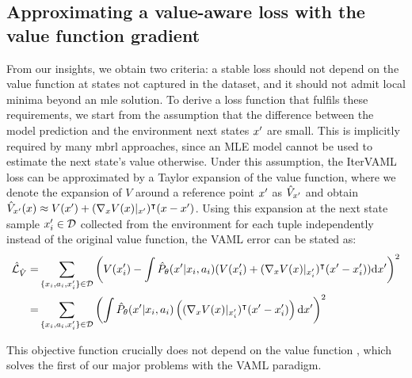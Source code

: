 \subsection{Approximating a value-aware loss with the value function gradient}
From our insights, we obtain two criteria: a stable loss should not depend on the value function at states not captured in the dataset, and it should not admit local minima beyond an \ac{mle} solution.
To derive a loss function that fulfils these requirements, we start from the assumption that the difference between the model prediction and the environment next states $x'$ are small.
This is implicitly required by many \ac{mbrl} approaches, since an MLE model cannot be used to estimate the next state's value otherwise. 
Under this assumption, the IterVAML loss can be approximated by a Taylor expansion of the value function, where we denote the expansion of $V$ around a reference point $x'$ as $\hat{V}_{x'}$ and obtain $\hat{V}_{x'}(x) \approx V(x') + (\nabla_x V(x)|_{x'})^\intercal (x - x')$.
Using this expansion at the next state sample $x'_i \in \mathcal{D}$ collected from the environment for each tuple independently instead of the original value function, the VAML error can be stated as:
\begin{align}
    \hat{\mathcal{L}}_{\hat{V}}=&\sum_{\{x_i,a_i,x'_i\}\in\mathcal{D}}{\left(V(x'_i) - \int \hat{P}_\theta(x'|x_i,a_i) (V(x'_i) + (\nabla_x V(x)|_{x'_i})^\intercal (x' - x'_i)) \mathrm{d}x'\right)^2}\\
    =&\sum_{\{x_i,a_i,x'_i\}\in\mathcal{D}} {\left(\int \hat{P}_\theta(x'|x_i,a_i) \left((\nabla_x V(x)|_{x'_i})^\intercal(x' - x'_i) \right) \mathrm{d}x'\right)^2}
\end{align}

This objective function crucially does not depend on the value function , which solves the first of our major problems with the VAML paradigm.

